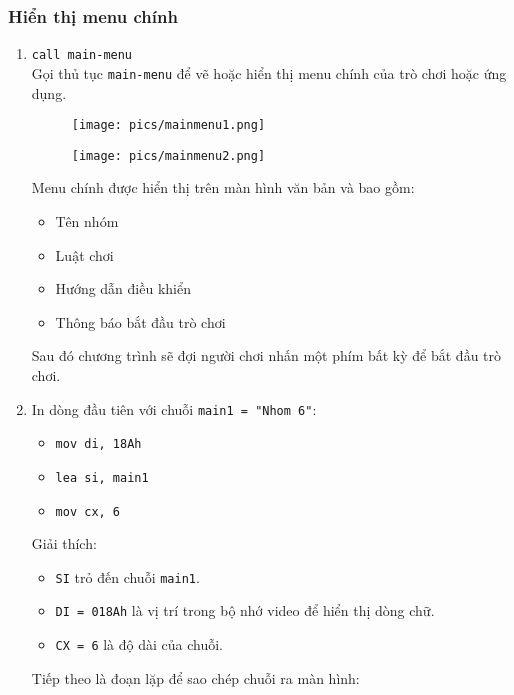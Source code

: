 \documentclass[12pt]{article}
\begin{document}
\subsubsection*{Hiển thị menu chính}
\begin{enumerate}[label=\textbf{\arabic*.}]
    \item \texttt{call main-menu} \\
    Gọi thủ tục \texttt{main-menu} để vẽ hoặc hiển thị menu chính của trò chơi hoặc ứng dụng.
 \begin{figure}[H]
  \centering
  \texttt{[image: pics/mainmenu1.png]}
\end{figure}
\begin{figure}[H]
  \centering
  \texttt{[image: pics/mainmenu2.png]}
\end{figure}
    Menu chính được hiển thị trên màn hình văn bản và bao gồm:
    \begin{itemize}
        \item Tên nhóm
        \item Luật chơi
        \item Hướng dẫn điều khiển
        \item Thông báo bắt đầu trò chơi
    \end{itemize}

    Sau đó chương trình sẽ đợi người chơi nhấn một phím bất kỳ để bắt đầu trò chơi.

    \item In dòng đầu tiên với chuỗi \texttt{main1 = "Nhom 6"}:
    
    \begin{itemize}
        \item \texttt{mov di, 18Ah}
        \item \texttt{lea si, main1}
        \item \texttt{mov cx, 6}
    \end{itemize}

    Giải thích:
    \begin{itemize}
        \item \texttt{SI} trỏ đến chuỗi \texttt{main1}.
        \item \texttt{DI = 018Ah} là vị trí trong bộ nhớ video để hiển thị dòng chữ.
        \item \texttt{CX = 6} là độ dài của chuỗi.
    \end{itemize}

    Tiếp theo là đoạn lặp để sao chép chuỗi ra màn hình:


\end{enumerate}
\end{document}
